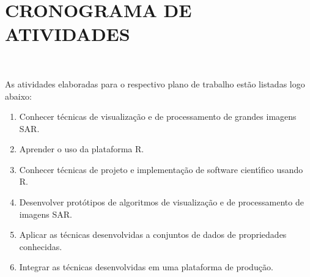 \documentclass[12pt]{article}
\begin{document}

\newpage
\section*{\centering \textbf{CRONOGRAMA DE ATIVIDADES}}
\hrulefill \\

\vspace{0.5cm}

As atividades elaboradas para o respectivo plano de trabalho estão listadas logo abaixo:

\begin{small}
\begin{enumerate} 
  \item  Conhecer técnicas de visualização e de processamento de grandes imagens SAR.
  \item  Aprender o uso da plataforma R.
  \item  Conhecer técnicas de projeto e implementação de software cientı́fico usando R.
  \item Desenvolver protótipos de algoritmos de visualização e de processamento de imagens SAR.
  \item Aplicar as técnicas desenvolvidas a conjuntos de dados de propriedades conhecidas.
  \item  Integrar as técnicas desenvolvidas em uma plataforma de produção.
\end{enumerate}
\end{small}
\end{document}
